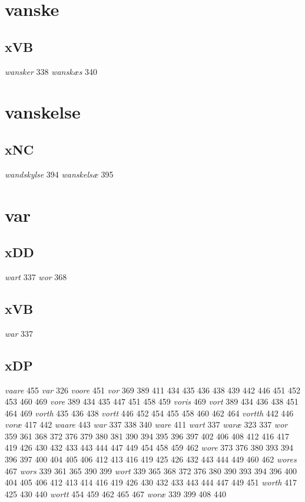 \documentclass[a4paper,twocolumn]{article}
\begin{document}
\section{vanske}
\label{sec:org035b643}
\subsection{xVB}
\label{sec:orgdae0f41}
\emph{wansker} 338 \emph{wanskæs} 340 
\section{vanskelse}
\label{sec:org8b362e8}
\subsection{xNC}
\label{sec:orgb8c6d91}
\emph{wandskylse} 394 \emph{wanskelsæ} 395 
\section{var}
\label{sec:orgdb6e5ea}
\subsection{xDD}
\label{sec:org2e2f0a9}
\emph{wart} 337 \emph{wor} 368 
\subsection{xVB}
\label{sec:org694b5ef}
\emph{war} 337 
\subsection{xDP}
\label{sec:org4dcf80a}
\emph{vaare} 455 \emph{var} 326 \emph{voore} 451 \emph{vor} 369 389 411 434 435 436 438 439 442 446 451 452 453 460 469 \emph{vore} 389 434 435 447 451 458 459 \emph{voris} 469 \emph{vort} 389 434 436 438 451 464 469 \emph{vorth} 435 436 438 \emph{vortt} 446 452 454 455 458 460 462 464 \emph{vortth} 442 446 \emph{voræ} 417 442 \emph{waare} 443 \emph{war} 337 338 340 \emph{ware} 411 \emph{wart} 337 \emph{waræ} 323 337 \emph{wor} 359 361 368 372 376 379 380 381 390 394 395 396 397 402 406 408 412 416 417 419 426 430 432 433 443 444 447 449 454 458 459 462 \emph{wore} 373 376 380 393 394 396 397 400 404 405 406 412 413 416 419 425 426 432 443 444 449 460 462 \emph{wores} 467 \emph{wors} 339 361 365 390 399 \emph{wort} 339 365 368 372 376 380 390 393 394 396 400 404 405 406 412 413 414 416 419 426 430 432 433 443 444 447 449 451 \emph{worth} 417 425 430 440 \emph{wortt} 454 459 462 465 467 \emph{woræ} 339 399 408 440 
\end{document}
